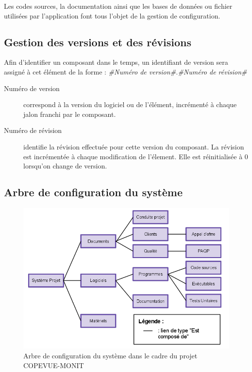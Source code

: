 \documentclass{mise_en_page}
\begin{document}
Les codes sources, la documentation ainsi que les bases de données ou fichier utilisées par l'application font tous l'objet de la gestion de configuration.

\subsection{Gestion des versions et des révisions}

Afin d'identifier un composant dans le temps, un identifiant de version sera assigné à cet élément de la forme : \emph{\#Numéro de version\#.\#Numéro de révision\#}

\begin{description}
	\item[Numéro de version]
		correspond à la version du logiciel ou de l'élément, incrémenté à chaque jalon franchi par le composant.
	\item[Numéro de révision]
		identifie la révision effectuée pour cette version du composant. La révision est incrémentée à chaque modification de l'élement. Elle est réinitialisée à 0 lorsqu'on change de version.
\end{description}

\subsection{Arbre de configuration du système}

\begin{figure}[H]
	\centering
	\includegraphics[width=150mm]{CONF.png}
	\caption{\label{CONF} Arbre de configuration du système dans le cadre du projet COPEVUE-MONIT}
\end{figure}
\end{document}
